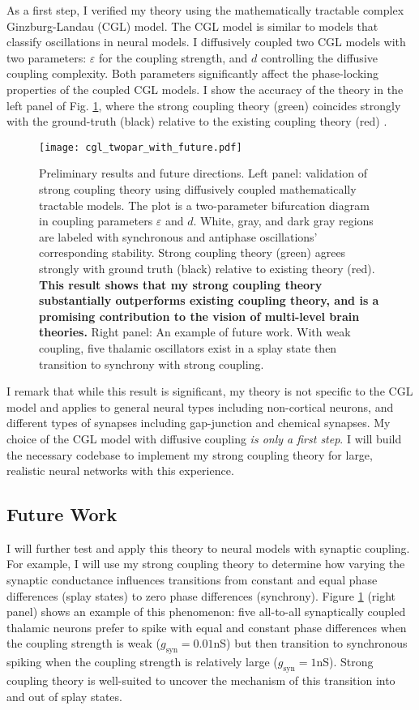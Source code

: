 \documentclass[a4paper,11pt]{article}
\newcommand{\ve}{\varepsilon}
\begin{document}
As a first step, I verified my theory using the mathematically tractable complex Ginzburg-Landau (CGL) model. The CGL model is similar to models that classify oscillations in neural models. I diffusively coupled two CGL models with two parameters: $\ve$ for the coupling strength, and $d$ controlling the diffusive coupling complexity. Both parameters significantly affect the phase-locking properties of the coupled CGL models. I show the accuracy of the theory in the left panel of Fig. \ref{fig:cgl}, where the strong coupling theory (green) coincides strongly with the ground-truth (black) relative to the existing coupling theory (red) \cite{wilson2019phase}. 

\begin{figure}[ht!]
	\centering
	\texttt{[image: cgl\_twopar\_with\_future.pdf]}
	\caption{Preliminary results and future directions. Left panel: validation of strong coupling theory using diffusively coupled mathematically tractable models. The plot is a two-parameter bifurcation diagram in coupling parameters $\ve$ and $d$. White, gray, and dark gray regions are labeled with synchronous and antiphase oscillations' corresponding stability. Strong coupling theory (green) agrees strongly with ground truth (black) relative to existing theory (red). \textbf{This result shows that my strong coupling theory substantially outperforms existing coupling theory, and is a promising contribution to the vision of multi-level brain theories.} Right panel: An example of future work. With weak coupling, five thalamic oscillators exist in a splay state then transition to synchrony with strong coupling.}\label{fig:cgl}
\end{figure}

I remark that while this result is significant, my theory is not specific to the CGL model and applies to general neural types including non-cortical neurons, and different types of synapses including gap-junction and chemical synapses. My choice of the CGL model with diffusive coupling \textit{is only a first step}. I will build the necessary codebase to implement my strong coupling theory for large, realistic neural networks with this experience.

\subsection{Future Work}

I will further test and apply this theory to neural models with synaptic coupling. For example, I will use my strong coupling theory to determine how varying the synaptic conductance influences transitions from constant and equal phase differences (splay states) to zero phase differences (synchrony).  Figure \ref{fig:cgl} (right panel) shows an example of this phenomenon: five all-to-all synaptically coupled thalamic neurons prefer to spike with equal and constant phase differences when the coupling strength is weak ($g_\text{syn}=0.01$nS) but then transition to synchronous spiking when the coupling strength is relatively large ($g_\text{syn}=1$nS). Strong coupling theory is well-suited to uncover the mechanism of this transition into and out of splay states.
\end{document}
